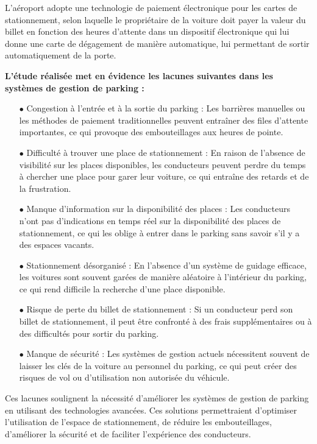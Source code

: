L'aéroport adopte une technologie de paiement électronique pour les cartes de stationnement, selon laquelle le propriétaire de la voiture doit payer la valeur du billet en fonction des heures d'attente dans un dispositif électronique qui lui donne une carte de dégagement de manière automatique, lui permettant de sortir automatiquement de la porte.

  
\textbf{L'étude réalisée met en évidence les lacunes suivantes dans les systèmes de gestion de parking :}
\begin{enumerate}
   \item [$\bullet$] Congestion à l'entrée et à la sortie du parking : Les barrières manuelles ou les méthodes de paiement traditionnelles peuvent entraîner des files d'attente importantes, ce qui provoque des embouteillages aux heures de pointe.
   \item [$\bullet$] Difficulté à trouver une place de stationnement : En raison de l'absence de visibilité sur les places disponibles, les conducteurs peuvent perdre du temps à chercher une place pour garer leur voiture, ce qui entraîne des retards et de la frustration.
   \item [$\bullet$] Manque d'information sur la disponibilité des places : Les conducteurs n'ont pas d'indications en temps réel sur la disponibilité des places de stationnement, ce qui les oblige à entrer dans le parking sans savoir s'il y a des espaces vacants.
   \item [$\bullet$] Stationnement désorganisé : En l'absence d'un système de guidage efficace, les voitures sont souvent garées de manière aléatoire à l'intérieur du parking, ce qui rend difficile la recherche d'une place disponible.
   \item [$\bullet$] Risque de perte du billet de stationnement : Si un conducteur perd son billet de stationnement, il peut être confronté à des frais supplémentaires ou à des difficultés pour sortir du parking.
   \item [$\bullet$] Manque de sécurité : Les systèmes de gestion actuels nécessitent souvent de laisser les clés de la voiture au personnel du parking, ce qui peut créer des risques de vol ou d'utilisation non autorisée du véhicule.
\end{enumerate}
Ces lacunes soulignent la nécessité d'améliorer les systèmes de gestion de parking en utilisant des technologies avancées. Ces solutions permettraient d'optimiser l'utilisation de l'espace de stationnement, de réduire les embouteillages, d'améliorer la sécurité et de faciliter l'expérience des conducteurs.


